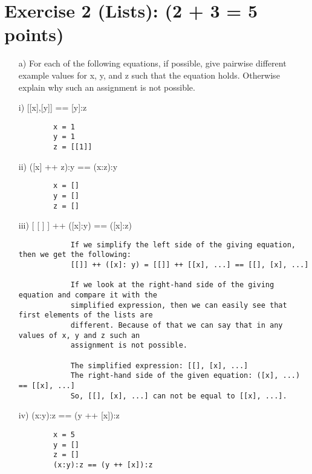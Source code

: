 \documentclass[10pt]{article}
\begin{document}
\section*{Exercise 2 (Lists): (2 + 3 = 5 points)
}
\begin{itemize}
	\item[a)] For each of the following equations, if possible, give pairwise different example values for x, y, and z such that the equation holds. Otherwise explain why such an assignment is not possible.
	
	i) [[x],[y]] == [y]:z
	\begin{addmargin}[0em]{2em}
		\begin{lstlisting}
		x = 1
		y = 1
		z = [[1]]
		\end{lstlisting}
	\end{addmargin}
	
	ii) ([x] ++ z):y == (x:z):y
	\begin{addmargin}[0em]{2em}
		\begin{lstlisting}
		x = []
		y = []
		z = []
		\end{lstlisting}
	\end{addmargin}
	
	iii) [ [ ] ] ++ ([x]:y) == ([x]:z)
	\begin{addmargin}[0em]{2em}
		\begin{lstlisting}
			If we simplify the left side of the giving equation, then we get the following:
			[[]] ++ ([x]: y) = [[]] ++ [[x], ...] == [[], [x], ...]
			
			If we look at the right-hand side of the giving equation and compare it with the
			simplified expression, then we can easily see that first elements of the lists are
			different. Because of that we can say that in any values of x, y and z such an 
			assignment is not possible.
			
			The simplified expression: [[], [x], ...] 
			The right-hand side of the given equation: ([x], ...) == [[x], ...]
			So, [[], [x], ...] can not be equal to [[x], ...].
		\end{lstlisting}
	\end{addmargin}
	
	iv) (x:y):z == (y ++ [x]):z
	\begin{addmargin}[0em]{2em}
		\begin{lstlisting}
		x = 5
		y = []
		z = []
		(x:y):z == (y ++ [x]):z
		\end{lstlisting}
	\end{addmargin}
	

\end{itemize}
\end{document}
